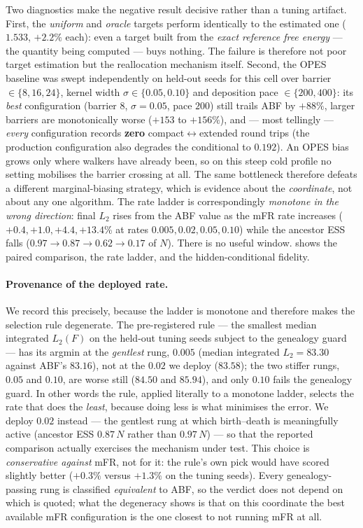 Two diagnostics make the negative result decisive rather than a tuning artifact. First, the
\emph{uniform} and \emph{oracle} targets perform identically to the estimated one
($1.533$, $+2.2\%$ each): even a target built from the \emph{exact reference free energy} ---
the quantity being computed --- buys nothing. The failure is therefore not poor target
estimation but the reallocation mechanism itself. Second, the OPES baseline was swept
independently on held-out seeds for this cell over barrier $\in\{8,16,24\}$, kernel width
$\sigma\in\{0.05,0.10\}$ and deposition pace $\in\{200,400\}$: its \emph{best} configuration
(barrier $8$, $\sigma=0.05$, pace $200$) still trails ABF by $+88\%$, larger barriers are
monotonically worse ($+153$ to $+156\%$), and --- most tellingly --- \emph{every} configuration
records \textbf{zero} compact$\leftrightarrow$extended round trips (the production
configuration also degrades the conditional to $0.192$). An OPES bias grows only where walkers
have already been, so on this steep cold profile no setting mobilises the barrier crossing at
all. The same bottleneck therefore defeats a
different marginal-biasing strategy, which is evidence about the \emph{coordinate}, not about
any one algorithm. The rate ladder is correspondingly
\emph{monotone in the wrong direction}: final $L_2$ rises from the ABF value as the mFR rate
increases ($+0.4,+1.0,+4.4,+13.4$\% at rates $0.005,0.02,0.05,0.10$) while the ancestor ESS
falls ($0.97\!\to\!0.87\!\to\!0.62\!\to\!0.17$ of $N$). There is no useful
window.  shows the paired comparison, the rate ladder, and the
hidden-conditional fidelity.

\paragraph{Provenance of the deployed rate.} We record this precisely, because the ladder is
monotone and therefore makes the selection rule degenerate. The pre-registered rule --- the
smallest median integrated $L_2(F)$ on the held-out tuning seeds subject to the genealogy
guard --- has its argmin at the \emph{gentlest} rung, $0.005$ (median integrated
$L_2=83.30$ against ABF's $83.16$), not at the $0.02$ we deploy ($83.58$); the two stiffer
rungs, $0.05$ and $0.10$, are worse still ($84.50$ and $85.94$), and only $0.10$ fails the
genealogy guard. In other words the rule, applied literally to a monotone ladder, selects the rate that
does the \emph{least}, because doing less is what minimises the error. We deploy $0.02$
instead --- the gentlest rung at which birth--death is meaningfully active (ancestor ESS
$0.87\,N$ rather than $0.97\,N$) --- so that the reported comparison actually exercises the
mechanism under test. This choice is \emph{conservative against} mFR, not for it: the rule's
own pick would have scored slightly better ($+0.3\%$ versus $+1.3\%$ on the tuning seeds).
Every genealogy-passing rung is classified \emph{equivalent} to ABF, so the verdict does not
depend on which is quoted; what the degeneracy shows is that on this coordinate the best
available mFR configuration is the one closest to not running mFR at all.


